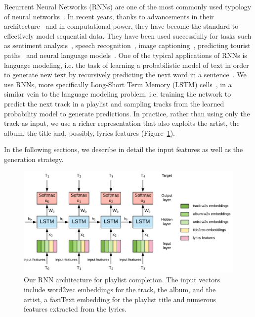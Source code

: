 Recurrent Neural Networks (RNNs) are one of the most commonly used typology of neural networks~\cite{Lecun2015}. In recent years, thanks to advancements in their architecture~\cite{Hochreiter1997,Chung2014} and in computational power, they have become the standard to effectively model sequential data. They have been used successfully for tasks such as sentiment analysis~\cite{Tang2015}, speech recognition~\cite{Graves2013}, image captioning~\cite{Karpathy2015}, predicting tourist paths~\cite{Palumbo2017} and neural language models~\cite{Mikolov2010}. One of the typical applications of RNNs is language modeling, i.e. the task of learning a probabilistic model of text in order to generate new text by recursively predicting the next word in a sentence~\cite{Sutskever2011}. We use RNNs, more specifically Long-Short Term Memory (LSTM) cells~\cite{Hochreiter1997}, in a similar vein to the language modeling problem, i.e. training the network to predict the next track in a playlist and sampling tracks from the learned probability model to generate predictions. In practice, rather than using only the track as input, we use a richer representation that also exploits the artist, the album, the title and, possibly, lyrics features (Figure~\ref{rnn:fig:global_architecture}). 

In the following sections, we describe in detail the input features as well as the generation strategy.

\begin{figure}
\centering
\includegraphics[width=\textwidth]{rnn}
\caption[RNN architecture for playlist completion]{Our RNN architecture for playlist completion. The input vectors include word2vec embeddings for the track, the album, and the artist, a fastText embedding for the playlist title and numerous features extracted from the lyrics.}
\label{rnn:fig:global_architecture}
\end{figure}

